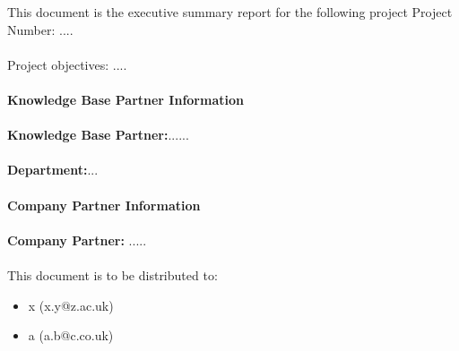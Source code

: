 \maketitle
This document is the executive summary report for the following project
Project Number: ....
\\\\
Project objectives: ....
\\\\
\textbf{Knowledge Base Partner Information}
\\\\
\textbf{Knowledge Base Partner:}......
\\\\
\textbf{Department:}...
\\\\
\textbf{Company Partner Information}
\\\\
 \textbf{Company Partner:} .....
\\\\
This document is to be distributed to:
\begin{itemize}

    \item x (x.y@z.ac.uk)
    \item a (a.b@c.co.uk)
 
\end{itemize}
